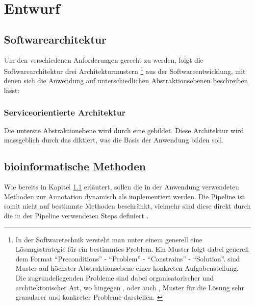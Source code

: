 \chapter{Entwurf}

\section{Softwarearchitektur}\label{chp:softwarearchitektur}
Um den verschiedenen Anforderungen gerecht zu werden,
folgt die Softwarearchitektur drei Architekturmustern
\footnote{
In der Softwaretechnik versteht man unter einem  generell eine
Lösungsstrategie für ein bestimmtes Problem.
Ein Muster folgt dabei generell dem Format \enquote{Preconditions} -
\enquote{Problem} - \enquote{Constrains} - \enquote{Solution}.
\citep{beck_patterns_1994}
 sind Muster auf höchster Abstraktionsebene
einer konkreten Aufgabenstellung.
Die zugrundeliegenden Probleme sind dabei organisatorischer und
architektonischer Art, wo hingegen , oder
auch , Muster für die Lösung sehr granularer und konkreter
Probleme darstellen.
\citep{buschmann_pattern-oriented_1996}
}
aus der
Softwareentwicklung, mit denen sich die Anwendung auf unterschiedlichen
Abstraktionsebenen beschreiben lässt:





\subsection{Serviceorientierte Architektur}
Die unterste Abstraktionebene wird durch eine  gebildet.
Diese Architektur wird massgeblich durch das 
diktiert, was die Basis der Anwendung bilden soll.



\section{bioinformatische Methoden}
Wie bereits in Kapitel \ref{chp:softwarearchitektur} erläutert, sollen die in
der Anwendung verwendeten Methoden zur Annotation dynamisch als 
implementiert werden. Die Pipeline ist somit nicht auf bestimmte Methoden
beschränkt, vielmehr sind diese direkt durch die in der Pipeline verwendeten
Steps definiert .

